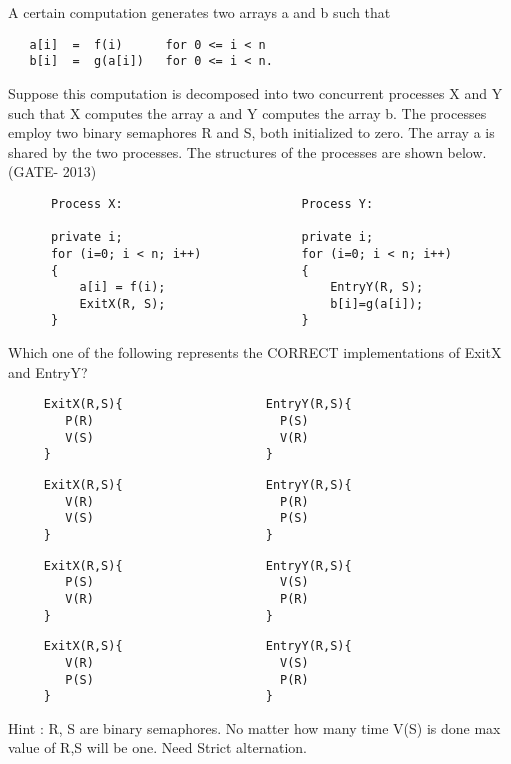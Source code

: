 \begin{questyle}

  \question  A certain computation generates two arrays a and b such that

  \begin{lstlisting}
   a[i]  =  f(i)      for 0 <= i < n
   b[i]  =  g(a[i])   for 0 <= i < n.
  \end{lstlisting}

             Suppose this computation is decomposed into two concurrent processes X and Y such that X computes
             the array a and Y computes the array b. The processes employ two binary semaphores R and S,
             both initialized to zero. The array a is shared by the two processes.
             The structures of the processes are shown below. (GATE- 2013)

  \begin{lstlisting}
      Process X:                         Process Y:

      private i;                         private i;
      for (i=0; i < n; i++)              for (i=0; i < n; i++)
      {                                  {
          a[i] = f(i);                       EntryY(R, S);
          ExitX(R, S);                       b[i]=g(a[i]);
      }                                  }
  \end{lstlisting}
  Which one of the following represents the CORRECT implementations of ExitX and EntryY?
  \begin{choices}
    \choice
      \begin{lstlisting}
     ExitX(R,S){                    EntryY(R,S){
        P(R)                          P(S)
        V(S)                          V(R)
     }                              }
  \end{lstlisting}

  \choice
      \begin{lstlisting}
     ExitX(R,S){                    EntryY(R,S){
        V(R)                          P(R)
        V(S)                          P(S)
     }                              }
  \end{lstlisting}

  \choice
      \begin{lstlisting}
     ExitX(R,S){                    EntryY(R,S){
        P(S)                          V(S)
        V(R)                          P(R)
     }                              }
  \end{lstlisting}

  \choice
      \begin{lstlisting}
     ExitX(R,S){                    EntryY(R,S){
        V(R)                          V(S)
        P(S)                          P(R)
     }                              }
  \end{lstlisting}

  \end{choices}
  Hint : R, S are binary semaphores. No matter how many time V(S) is done max value of R,S will be one.
  Need Strict alternation.
  \end{questyle}


